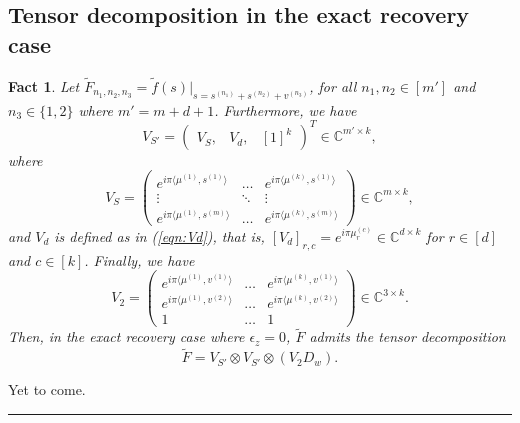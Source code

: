 \documentclass[11pt]{article}
\newtheorem{fact}[theorem]{Fact}
\newenvironment{proof}{{\bf Proof\quad}}{\hfill\rule{2mm}{2mm}}
\begin{document}
\subsection{Tensor decomposition in the exact recovery case}
\begin{fact}
    Let $\tilde{F}_{n_1,n_2,n_3}=\tilde{f}(s)\big|_{s=s^{(n_1)}+s^{(n_2)}+v^{(n_3)}}$, for all $n_1,n_2\in[m']$ and $n_3\in\{1,2\}$ where $m'=m+d+1$. Furthermore, we have 
    \begin{equation}
        V_{S'}=
        \begin{pmatrix}
            V_S,&V_d,&[1]^k
        \end{pmatrix}^T\in\mathbb{C}^{m'\times k},
    \end{equation}
    where 
    \begin{equation}
        V_S=\begin{pmatrix}
            e^{i\pi\langle\mu^{(1)},s^{(1)}\rangle}&\ldots&e^{i\pi\langle\mu^{(k)},s^{(1)}\rangle}\\
            \vdots&\ddots&\vdots\\
            e^{i\pi\langle\mu^{(1)},s^{(m)}\rangle}&\ldots&e^{i\pi\langle\mu^{(k)},s^{(m)}\rangle}
        \end{pmatrix}\in\mathbb{C}^{m\times k},
    \end{equation}
    and $V_d$ is defined as in (\ref{eqn:Vd}), that is, $[V_d]_{r,c}=e^{i\pi\mu_r^{(c)}}\in\mathbb{C}^{d\times k}$ for $r\in[d]$ and $c\in[k]$. Finally, we have 
    \begin{equation}
        V_2=\begin{pmatrix}
            e^{i\pi\langle\mu^{(1)},v^{(1)}\rangle}&\ldots&e^{i\pi\langle\mu^{(k)},v^{(1)}\rangle}\\
            e^{i\pi\langle\mu^{(1)},v^{(2)}\rangle}&\ldots&e^{i\pi\langle\mu^{(k)},v^{(2)}\rangle}\\
            1&\ldots&1
        \end{pmatrix}\in\mathbb{C}^{3\times k}.
    \end{equation}
    Then, in the exact recovery case where $\epsilon_z=0$, $\tilde{F}$ admits the tensor decomposition $$\tilde{F}=V_{S'}\otimes V_{S'}\otimes(V_2D_w).$$
\end{fact}
\begin{proof}
    Yet to come.
\end{proof}
\end{document}
